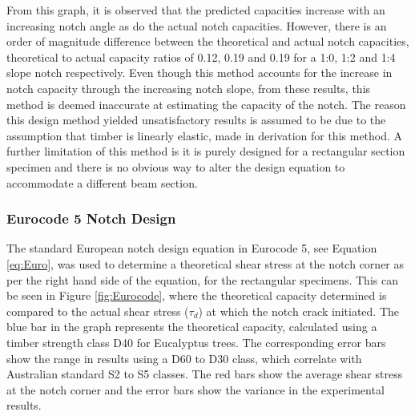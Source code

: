 \documentclass[11pt,a4paper]{article}
\numberwithin{equation}{subsection}
\begin{document}
\vspace*{\baselineskip}

\noindent
From this graph, it is observed that the predicted capacities increase with an increasing notch angle as do the actual notch capacities. However, there is an order of magnitude difference between the theoretical and actual notch capacities, theoretical to actual capacity ratios of 0.12, 0.19 and 0.19 for a 1:0, 1:2 and 1:4 slope notch respectively. Even though this method accounts for the increase in notch capacity through the increasing notch slope, from these results, this method is deemed inaccurate at estimating the capacity of the notch. The reason this design method yielded unsatisfactory results is assumed to be due to the assumption that timber is linearly elastic, made in derivation for this method.  A further limitation of this method is it is purely designed for a rectangular section specimen and there is no obvious way to alter the design equation to accommodate a different beam section.

\subsubsection{Eurocode 5 Notch Design}
The standard European notch design equation in Eurocode 5, see Equation \ref{eq:Euro}, was used to determine a theoretical shear stress at the notch corner as per the right hand side of the equation, for the rectangular specimens. This can be seen in Figure \ref{fig:Eurocode}, where the theoretical capacity determined is compared to the actual shear stress ($\tau_{d}$) at which the notch crack initiated. The blue bar in the graph represents the theoretical capacity, calculated using a timber strength class D40 for Eucalyptus trees. The corresponding error bars show the range in results using a D60 to D30 class, which correlate with Australian standard S2 to S5 classes. The red bars show the average shear stress at the notch corner and the error bars show the variance in the experimental results. 
\end{document}
